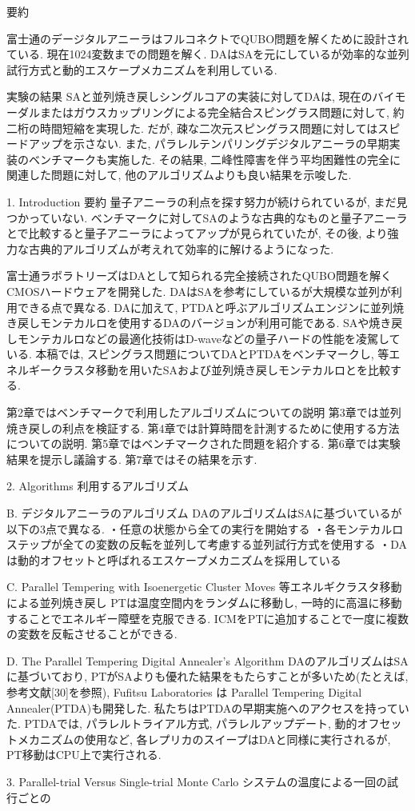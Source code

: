 要約

富士通のデージタルアニーラはフルコネクトでQUBO問題を解くために設計されている.
現在1024変数までの問題を解く. 
DAはSAを元にしているが効率的な並列試行方式と動的エスケープメカニズムを利用している. 

実験の結果
SAと並列焼き戻しシングルコアの実装に対してDAは, 現在のバイモーダルまたはガウスカップリングによる完全結合スピングラス問題に対して, 約二桁の時間短縮を実現した. 
だが, 疎な二次元スピングラス問題に対してはスピードアップを示さない. 
また, パラレルテンパリングデジタルアニーラの早期実装のベンチマークも実施した. 
その結果, 二峰性障害を伴う平均困難性の完全に関連した問題に対して, 他のアルゴリズムよりも良い結果を示唆した. 

1. Introduction 要約
量子アニーラの利点を探す努力が続けられているが, まだ見つかっていない. 
ベンチマークに対してSAのような古典的なものと量子アニーラとで比較すると量子アニーラによってアップが見られていたが, その後, より強力な古典的アルゴリズムが考えれて効率的に解けるようになった.

富士通ラボラトリーズはDAとして知られる完全接続されたQUBO問題を解くCMOSハードウェアを開発した. 
DAはSAを参考にしているが大規模な並列が利用できる点で異なる. 
DAに加えて, PTDAと呼ぶアルゴリズムエンジンに並列焼き戻しモンテカルロを使用するDAのバージョンが利用可能である. 
SAや焼き戻しモンテカルロなどの最適化技術はD-waveなどの量子ハードの性能を凌駕している. 
本稿では, スピングラス問題についてDAとPTDAをベンチマークし, 等エネルギークラスタ移動を用いたSAおよび並列焼き戻しモンテカルロとを比較する. 

第2章ではベンチマークで利用したアルゴリズムについての説明
第3章では並列焼き戻しの利点を検証する. 
第4章では計算時間を計測するために使用する方法についての説明. 
第5章ではベンチマークされた問題を紹介する. 
第6章では実験結果を提示し議論する. 
第7章ではその結果を示す. 

2. Algorithms 利用するアルゴリズム

B. デジタルアニーラのアルゴリズム
DAのアルゴリズムはSAに基づいているが以下の3点で異なる. 
・任意の状態から全ての実行を開始する
・各モンテカルロステップが全ての変数の反転を並列して考慮する並列試行方式を使用する
・DAは動的オフセットと呼ばれるエスケープメカニズムを採用している

C. Parallel Tempering with Isoenergetic Cluster Moves 等エネルギクラスタ移動による並列焼き戻し
PTは温度空間内をランダムに移動し, 一時的に高温に移動することでエネルギー障壁を克服できる. 
ICMをPTに追加することで一度に複数の変数を反転させることができる. 

D. The Parallel Tempering Digital Annealer's Algorithm
DAのアルゴリズムはSAに基づいており, PTがSAよりも優れた結果をもたらすことが多いため(たとえば, 参考文献[30]を参照), Fufitsu Laboratories は Parallel Tempering Digital Annealer(PTDA)も開発した. 
私たちはPTDAの早期実施へのアクセスを持っていた. 
PTDAでは, パラレルトライアル方式, パラレルアップデート, 動的オフセットメカニズムの使用など, 各レプリカのスイープはDAと同様に実行されるが, PT移動はCPU上で実行される. 


3. Parallel-trial Versus Single-trial Monte Carlo
システムの温度による一回の試行ごとの


